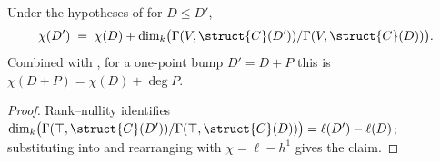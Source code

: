 \begin{theorem}
  \label{thm:adelic_chi_additivity}
  \leanok
  Under the hypotheses of  for
  \(D \le D'\),
  \[
    \chi(D') \;=\; \chi(D) + \dim_k\bigl(\Gamma(V,\struct{C}(D'))/
      \Gamma(V,\struct{C}(D))\bigr).
  \]
  Combined with , for a
  one-point bump \(D' = D + P\) this is \(\chi(D+P) = \chi(D) + \deg P\).
\end{theorem}
\begin{proof}
  \leanok
  Rank--nullity identifies
  \(\dim_k\bigl(\Gamma(\top,\struct{C}(D'))/\Gamma(\top,\struct{C}(D))\bigr)
  = \ell(D') - \ell(D)\); substituting into
   and rearranging with
  \(\chi = \ell - h^1\) gives the claim.
\end{proof}


